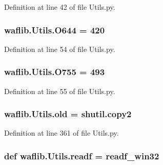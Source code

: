 Definition at line 42 of file Utils.\+py.

\subsubsection[{\texorpdfstring{O644}{O644}}]{ waflib.\+Utils.\+O644 = 420}\hypertarget{namespacewaflib_1_1_utils_ade9dd27fadbf52a0641bbff06d3dd3ac}{}\label{namespacewaflib_1_1_utils_ade9dd27fadbf52a0641bbff06d3dd3ac}


Definition at line 54 of file Utils.\+py.

\subsubsection[{\texorpdfstring{O755}{O755}}]{ waflib.\+Utils.\+O755 = 493}\hypertarget{namespacewaflib_1_1_utils_a8b5303a851e4ada6a9bca3ed5c4bf8af}{}\label{namespacewaflib_1_1_utils_a8b5303a851e4ada6a9bca3ed5c4bf8af}


Definition at line 55 of file Utils.\+py.

\subsubsection[{\texorpdfstring{old}{old}}]{\setlength{\rightskip}{0pt plus 5cm}waflib.\+Utils.\+old = shutil.\+copy2}\hypertarget{namespacewaflib_1_1_utils_ac5e167303eb0d1a7a20df3daf91a264c}{}\label{namespacewaflib_1_1_utils_ac5e167303eb0d1a7a20df3daf91a264c}


Definition at line 361 of file Utils.\+py.

\subsubsection[{\texorpdfstring{readf}{readf}}]{\setlength{\rightskip}{0pt plus 5cm}def waflib.\+Utils.\+readf = {\bf readf\+\_\+win32}}\hypertarget{namespacewaflib_1_1_utils_af0ce978e14035d9e057c481386b840ac}{}\label{namespacewaflib_1_1_utils_af0ce978e14035d9e057c481386b840ac}


